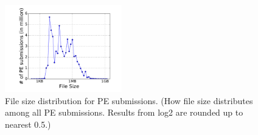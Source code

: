 \begin{figure}[t!]
\begin{center}
\includegraphics[width=2in]{figure/pesize}
\caption{File size distribution for PE submissions.
(How file size distributes among all PE submissions. 
Results from log2 are rounded up to nearest 0.5.)
}
\label{fig:pesize}
\end{center}
\end{figure}
